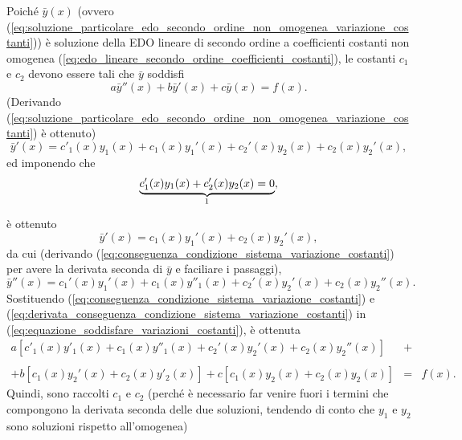 \noindent Poiché $\bar y(x)$ (ovvero (\ref{eq:soluzione_particolare_edo_secondo_ordine_non_omogenea_variazione_costanti})) è soluzione della EDO lineare di secondo ordine a coefficienti costanti non omogenea (\ref{eq:edo_lineare_secondo_ordine_coefficienti_costanti}), le costanti $c_1$ e $c_2$ devono essere tali che $\bar{y}$ soddisfi
\begin{equation}\label{eq:equazione_soddisfare_variazioni_costanti}
	a\bar{y}''(x) + b\bar{y}'(x) + c\bar{y}(x) = f(x).
\end{equation}
(Derivando (\ref{eq:soluzione_particolare_edo_secondo_ordine_non_omogenea_variazione_costanti}) è ottenuto)
\begin{equation*}
	\bar{y}'(x) = c'_1(x) y_1(x) + c_1(x)y_1'(x) + c_2'(x)y_2(x) + c_2(x)y_2'(x),
\end{equation*}
ed imponendo che
\begin{equation}\label{eq:condizione_sistema_risoluzione_edo_lineare_secondo_ordine_non_omogonea_variazione}
	\underbrace{c_1'(x)y_1(x) + c_2'(x) y_2(x) = 0}_{\footnotemark},
\end{equation}
è ottenuto
\begin{equation}\label{eq:conseguenza_condizione_sistema_variazione_costanti}
	\bar{y}'(x) = c_1(x) y_1'(x) + c_2(x) y_2'(x),
\end{equation}
da cui (derivando (\ref{eq:conseguenza_condizione_sistema_variazione_costanti}) per avere la derivata seconda di $\bar{y}$ e faciliare i passaggi),
\begin{equation}\label{eq:derivata_conseguenza_condizione_sistema_variazione_costanti}
	\bar{y}''(x) = c_1'(x) y_1'(x) + c_1(x)y''_1(x) + c_2'(x) y_2'(x) + c_2(x)y_2''(x).
\end{equation}
Sostituendo (\ref{eq:conseguenza_condizione_sistema_variazione_costanti}) e (\ref{eq:derivata_conseguenza_condizione_sistema_variazione_costanti}) in (\ref{eq:equazione_soddisfare_variazioni_costanti}), è ottenuta
\begin{equation}\label{eq:punto_inizio_trucco}
	\begin{matrix}
		a[c'_1(x)y'_1(x) + c_1(x) y''_1(x) + c_2'(x) y_2'(x) + c_2(x) y_2''(x)] &+&\\\\
		+ b[c_1(x) y_2'(x) + c_2(x)y'_2(x)] + c[c_1(x)y_2(x) + c_2(x)y_2(x)] &=& f(x).
	\end{matrix}
\end{equation}
Quindi, sono raccolti $c_1$ e $c_2$ (perché è necessario far venire fuori i termini che compongono la derivata seconda delle due soluzioni, tendendo di conto che $y_1$ e $y_2$ sono soluzioni rispetto all'omogenea)

